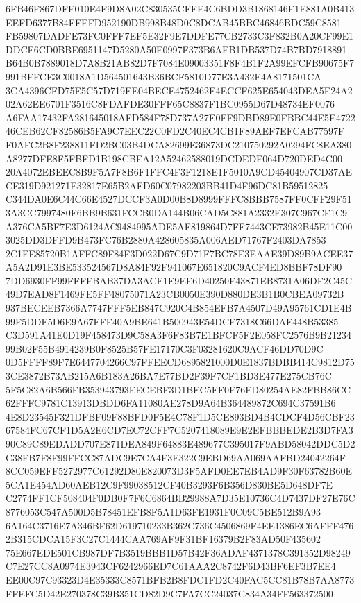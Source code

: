 \documentclass[UTF8,fontset=fandol,zihao=-4,a4paper]{ctexart}
\begin{document}
{{6FB46F867DFE010E4F9D8A02C830535CFFE4C6BDD3B1868146E1E881A0B413EEFD6377B84FFEFD952190DB998B48D0C8DCAB45BBC46846BDC59C8581
FB59807DADFE73FC0FFF7EF5E32F9E7DDFE77CB2733C3F832B0A20CF99E1DDCF6CD0BBE6951147D5280A50E0997F373B6AEB1DB537D74B7BD7918891
B64B0B7889018D7A8B21AB82D7F7084E09003351F8F4B1F2A99EFCFB90675F7991BFFCE3C0018A1D564501643B36BCF5810D77E3A432F4A8171501CA
3CA4396CFD75E5C57D719EE04BECE4752462E4ECCF625E654043DEA5E24A202A62EE6701F3516C8FDAFDE30FFF65C8837F1BC0955D67D48734EF0076
A6FAA17432FA281645018AFD584F78D737A27E0FF9DBD89E0FBBC44E5E472246CEB62CF82586B5FA9C7EEC22C0FD2C40EC4CB1F89AEF7EFCAB77597F
F0AFC2B8F238811FD2BC03B4DCA82699E36873DC210750292A0294FC8EA380A8277DFE8F5FBFD1B198CBEA12A52462588019DCDEDF064D720DED4C00
20A4072EBEEC8B9F5A7F8B6F1FFC4F3F1218E1F5010A9CD45404907CD37AECE319D921271E32817E65B2AFD60C07982203BB41D4F96DC81B59512825
C344DA0E6C44C66E4527DCCF3A0D00B8D8999FFFC8BBB7587FF0CFF29F513A3CC7997480F6BB9B631FCCB0DA144B06CAD5C881A2332E307C967CF1C9
A376CA5BF7E3D6124AC9484995ADE5AF819864D7FF7443CE73982B45E11C003025DD3DFFD9B473FC76B2880A428605835A006AED71767F2403DA7853
2C1FE85720B1AFFC89F84F3D022D67C9D71F7BC78E3EAAE39D89B9ACEE37A5A2D91E3BE533524567D8A84F92F941067E651820C9ACF4ED8BBF78DF90
7DD6930FF99FFFFBAB37DA3ACF1E9EE6D40250F43871EB8731A06DF2C45C49D7EAD8F1469FE5FF48075071A23CB0050E390D880DE3B1B0CBEA09732B
937BECEEB7366A7747FFF5EB847C920C4B854EFB7A4507D49A95761CD1E4B99F5DDF5D6E9A67FFF40A9BE641B500943E54DCF7318C66DAF448B53385
C3D591A41E0D19F458473D9C58A3F6F83B7E1BFCF5F2E058FC2576B9B2123499B02F55B4914239B0F8525B57FE17170C3F03281620C9ACF46DD70D9C
0D5FFFF89F7E6447704266C97FFEECD6895821000D0E1837BDBB414C9812D753CE3872B73AB215A6B183A26BA7E77BD2F39F7CF1BD3E477E275CB76C
5F5C82A6B566FB353943793EECEBF3D1BEC5FF0F76FD80254AE82FBB86CC62FFFC9781C13913DBDD6FA11080AE278D9A64B364489872C694C37591B6
4E8D23545F321DFBF09F88BFD0F5E4C78F1D5CE893BD4B4CDCF4D56CBF2367584FC67CF1D5A2E6CD7EC72CFF7C5207418089E9E2EFBBBEDE2B3D7FA3
90C89C89EDADD707E871DEA849F64883E489677C395017F9ABD58042DDC5D2C38FB7F8F99FFCC87ADC9E7CA4F3E322C9EBD69AA069AAFBD24042264F
8CC059EFF5272977C61292D80E820073D3F5AFD0EE7EB4AD9F30F63782B60E5CA1E454AD60AEB12C9F99038512CF40B3293F6B356D830BE5D648DF7E
C2774FF1CF508404F0DB0F7F6C6864BB29988A7D35E10736C4D7437DF27E76C8776053C547A500D5B78451EFB8F5A1D63FE1931F0C09C5BE512B9A93
6A164C3716E7A346BF62D619710233B362C736C4506869F4EE1386EC6AFFF4762B315CDCA15F3C27C1444CAA769AF9F31BF16379B2F83AD50F435602
75E667EDE501CB987DF7B3519BBB1D57B42F36ADAF4371378C391352D98249C7E27CC8A0974E3943CF6242966ED7C61AAA2C8742F6D43BF6EF3B7EE4
EE00C97C93323D4E35333C8571BFB2B8FDC1FD2C40FAC5CC81B78B7AA8773FFEFC5D42E270378C39B351CD82D9C7FA7CC24037C834A34FF563372500
}}
\end{document}
